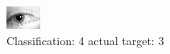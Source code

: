 \begin{figure}[h!]
\begin{center}
\includegraphics[width=0.60\columnwidth]{figures/ID1318_class_4_target_3.png}
\end{center}
\caption{ Classification: 4 actual target: 3}
\label{fig:ID1318_class_4_target_3}
\end{figure}
